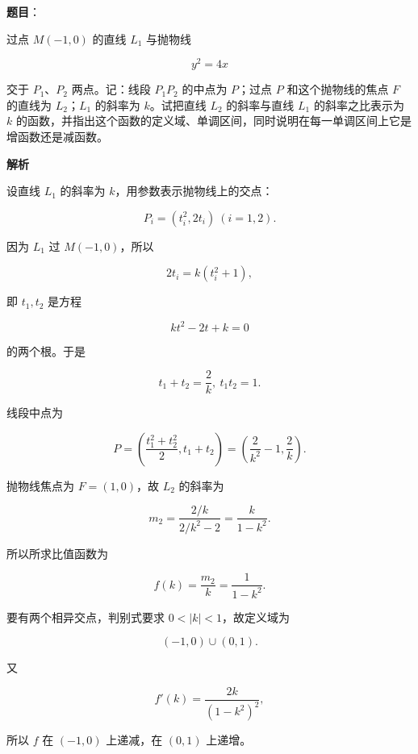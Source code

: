 \begin{answer}

\textbf{题目}：

过点 $M(-1,0)$ 的直线 $L_1$ 与抛物线

\nopagebreak[4]
\[
y^2=4x
\]

交于 $P_1\text{、}P_2$ 两点。记：线段 $P_1P_2$ 的中点为 $P$；过点 $P$ 和这个抛物线的焦点 $F$ 的直线为 $L_2$；$L_1$ 的斜率为 $k$。试把直线 $L_2$ 的斜率与直线 $L_1$ 的斜率之比表示为 $k$ 的函数，并指出这个函数的定义域、单调区间，同时说明在每一单调区间上它是增函数还是减函数。

\textbf{解析}

设直线 $L_1$ 的斜率为 $k$，用参数表示抛物线上的交点：

\nopagebreak[4]
\[
P_i=(t_i^2,2t_i)\ (i=1,2).
\]

因为 $L_1$ 过 $M(-1,0)$，所以

\nopagebreak[4]
\[
2t_i=k(t_i^2+1),
\]

即 $t_1,t_2$ 是方程

\nopagebreak[4]
\[
kt^2-2t+k=0
\]

的两个根。于是

\nopagebreak[4]
\[
t_1+t_2=\frac2k,\ t_1t_2=1.
\]

线段中点为

\nopagebreak[4]
\[
P=\left(\frac{t_1^2+t_2^2}{2},t_1+t_2\right)
=\left(\frac2{k^2}-1,\frac2k\right).
\]

抛物线焦点为 $F=(1,0)$，故 $L_2$ 的斜率为

\nopagebreak[4]
\[
m_2=\frac{2/k}{2/k^2-2}
=\frac{k}{1-k^2}.
\]

所以所求比值函数为

\nopagebreak[4]
\[
f(k)=\frac{m_2}{k}=\frac1{1-k^2}.
\]

要有两个相异交点，判别式要求 $0<|k|<1$，故定义域为

\nopagebreak[4]
\[
(-1,0)\cup(0,1).
\]

又

\nopagebreak[4]
\[
f'(k)=\frac{2k}{(1-k^2)^2},
\]

所以 $f$ 在 $(-1,0)$ 上递减，在 $(0,1)$ 上递增。


\end{answer}
